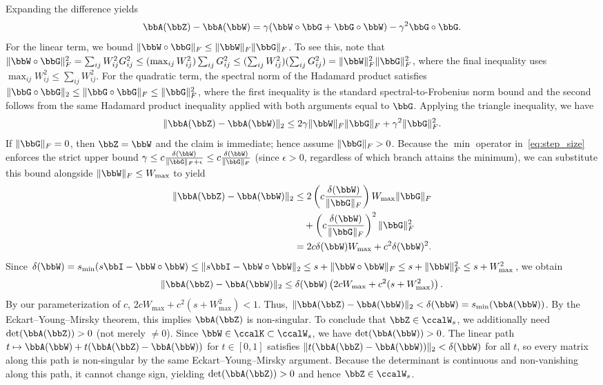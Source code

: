 \documentclass[conference]{IEEEtran}
\begin{document}
\begin{IEEEproof}
		Expanding the difference yields
		\begin{equation}
			\bbA(\bbZ) - \bbA(\bbW) = \gamma(\bbW \circ \bbG + \bbG \circ \bbW) - \gamma^2 \bbG \circ \bbG.
		\end{equation}
		For the linear term, we bound $\|\bbW \circ \bbG\|_F \leq \|\bbW\|_F \|\bbG\|_F$. To see this, note that $\|\bbW \circ \bbG\|_F^2 = \sum_{ij} W_{ij}^2 G_{ij}^2 \leq (\max_{ij} W_{ij}^2) \sum_{ij} G_{ij}^2 \leq (\sum_{ij} W_{ij}^2)(\sum_{ij} G_{ij}^2) = \|\bbW\|_F^2 \|\bbG\|_F^2$, where the final inequality uses $\max_{ij} W_{ij}^2 \leq \sum_{ij} W_{ij}^2$. For the quadratic term, the spectral norm of the Hadamard product satisfies $\|\bbG \circ \bbG\|_2 \leq \|\bbG \circ \bbG\|_F \leq \|\bbG\|_F^2$, where the first inequality is the standard spectral-to-Frobenius norm bound and the second follows from the same Hadamard product inequality applied with both arguments equal to $\bbG$. Applying the triangle inequality, we have
		\begin{equation}
			\|\bbA(\bbZ) - \bbA(\bbW)\|_2 \leq 2\gamma \|\bbW\|_F \|\bbG\|_F + \gamma^2 \|\bbG\|_F^2.
		\end{equation}
			If $\|\bbG\|_F = 0$, then $\bbZ = \bbW$ and the claim is immediate; hence assume $\|\bbG\|_F > 0$. Because the $\min$ operator in~\eqref{eq:step_size} enforces the strict upper bound $\gamma \leq c \frac{\delta(\bbW)}{\|\bbG\|_F + \epsilon} \leq c \frac{\delta(\bbW)}{\|\bbG\|_F}$ (since $\epsilon > 0$, regardless of which branch attains the minimum), we can substitute this bound alongside $\|\bbW\|_F \leq W_{\max}$ to yield
		\begin{align}
			\|\bbA(\bbZ) - \bbA(\bbW)\|_2 &\leq 2 \left(c \frac{\delta(\bbW)}{\|\bbG\|_F}\right) W_{\max} \|\bbG\|_F \notag \\
			&\quad + \left(c \frac{\delta(\bbW)}{\|\bbG\|_F}\right)^2 \|\bbG\|_F^2 \notag \\
			&= 2c \delta(\bbW) W_{\max} + c^2 \delta(\bbW)^2.
		\end{align}
		Since $\delta(\bbW) = s_{\min}(s\bbI - \bbW \circ \bbW) \leq \|s\bbI - \bbW \circ \bbW\|_2 \leq s + \|\bbW \circ \bbW\|_F \leq s + \|\bbW\|_F^2 \leq s + W_{\max}^2$, we obtain
		\begin{equation}
			\|\bbA(\bbZ) - \bbA(\bbW)\|_2 \leq \delta(\bbW)\left( 2c W_{\max} + c^2 (s + W_{\max}^2) \right).
		\end{equation}
		By our parameterization of $c$, $2c W_{\max} + c^2 (s + W_{\max}^2) < 1$. Thus, $\|\bbA(\bbZ) - \bbA(\bbW)\|_2 < \delta(\bbW) = s_{\min}(\bbA(\bbW))$. By the Eckart--Young--Mirsky theorem, this implies $\bbA(\bbZ)$ is non-singular. To conclude that $\bbZ \in \ccalW_s$, we additionally need $\det(\bbA(\bbZ)) > 0$ (not merely $\neq 0$). Since $\bbW \in \ccalK \subset \ccalW_s$, we have $\det(\bbA(\bbW)) > 0$. The linear path $t \mapsto \bbA(\bbW) + t(\bbA(\bbZ) - \bbA(\bbW))$ for $t \in [0,1]$ satisfies $\|t(\bbA(\bbZ) - \bbA(\bbW))\|_2 < \delta(\bbW)$ for all $t$, so every matrix along this path is non-singular by the same Eckart--Young--Mirsky argument. Because the determinant is continuous and non-vanishing along this path, it cannot change sign, yielding $\det(\bbA(\bbZ)) > 0$ and hence $\bbZ \in \ccalW_s$.

\end{IEEEproof}
\end{document}
